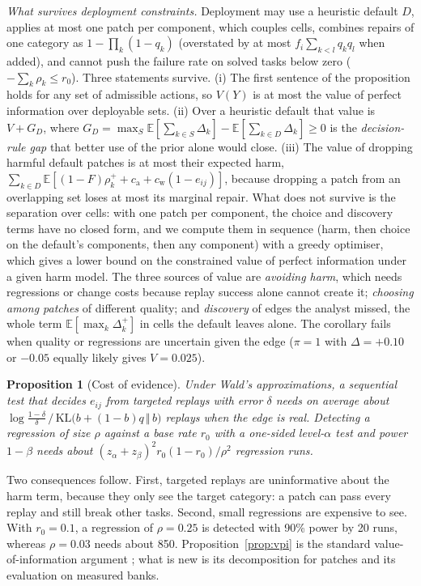 \documentclass[11pt]{article}
\newtheorem{proposition}{Proposition}
\begin{document}
\emph{What survives deployment constraints.} Deployment may use a heuristic default $D$, applies at most one patch per component, which couples cells, combines repairs of one category as $1-\prod_k(1-q_k)$ (overstated by at most $f_i\sum_{k<l}q_kq_l$ when added), and cannot push the failure rate on solved tasks below zero ($-\sum_k\rho_k\le r_0$). Three statements survive. (i) The first sentence of the proposition holds for any set of admissible actions, so $V(Y)$ is at most the value of perfect information over deployable sets. (ii) Over a heuristic default that value is $V+G_D$, where $G_D=\max_S\mathbb E[\sum_{k\in S}\Delta_k]-\mathbb E[\sum_{k\in D}\Delta_k]\ge0$ is the \emph{decision-rule gap} that better use of the prior alone would close. (iii) The value of dropping harmful default patches is at most their expected harm, $\sum_{k\in D}\mathbb E[(1-F)\rho_k^++c_{\mathrm a}+c_{\mathrm w}(1-e_{ij})]$, because dropping a patch from an overlapping set loses at most its marginal repair. What does not survive is the separation over cells: with one patch per component, the choice and discovery terms have no closed form, and we compute them in sequence (harm, then choice on the default's components, then any component) with a greedy optimiser, which gives a lower bound on the constrained value of perfect information under a given harm model. The three sources of value are \emph{avoiding harm}, which needs regressions or change costs because replay success alone cannot create it; \emph{choosing among patches} of different quality; and \emph{discovery} of edges the analyst missed, the whole term $\mathbb E[\max_k\Delta_k^+]$ in cells the default leaves alone. The corollary fails when quality or regressions are uncertain given the edge ($\pi=1$ with $\Delta=+0.10$ or $-0.05$ equally likely gives $V=0.025$).

\begin{proposition}[Cost of evidence]
\label{prop:cost}
Under Wald's approximations, a sequential test that decides $e_{ij}$ from targeted replays with error $\delta$ needs on average about $\log\frac{1-\delta}{\delta}\,/\,\mathrm{KL}\big(b+(1-b)q\,\Vert\, b\big)$ replays when the edge is real. Detecting a regression of size $\rho$ against a base rate $r_0$ with a one-sided level-$\alpha$ test and power $1-\beta$ needs about $(z_\alpha+z_\beta)^2 r_0(1-r_0)/\rho^2$ regression runs.
\end{proposition}

Two consequences follow. First, targeted replays are uninformative about the harm term, because they only see the target category: a patch can pass every replay and still break other tasks. Second, small regressions are expensive to see. With $r_0=0.1$, a regression of $\rho=0.25$ is detected with 90\% power by 20 runs, whereas $\rho=0.03$ needs about 850. Proposition~\ref{prop:vpi} is the standard value-of-information argument \citep{chaloner1995bayesian}; what is new is its decomposition for patches and its evaluation on measured banks.
\end{document}
